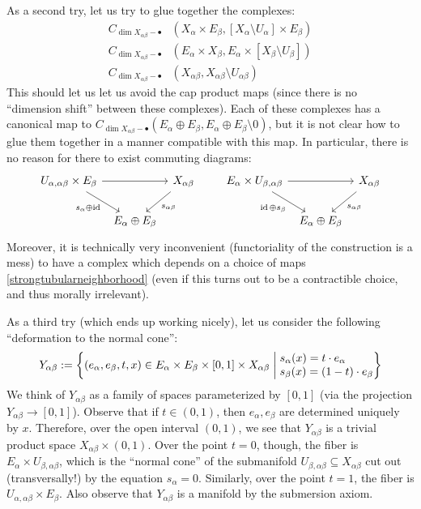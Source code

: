 \documentclass[12pt]{article}
\theoremstyle{definition}
\theoremstyle{remark}
\numberwithin{equation}{subsection}
\newcommand{\id}{\operatorname{id}}
\begin{document}
As a second try, let us try to glue together the complexes:
\begin{align}
C_{\dim X_{\alpha\beta}-\bullet}&(X_\alpha\times E_\beta,[X_\alpha\setminus U_\alpha]\times E_\beta)\\
C_{\dim X_{\alpha\beta}-\bullet}&(E_\alpha\times X_\beta,E_\alpha\times[X_\beta\setminus U_\beta])\\
C_{\dim X_{\alpha\beta}-\bullet}&(X_{\alpha\beta},X_{\alpha\beta}\setminus U_{\alpha\beta})
\end{align}
This should let us let us avoid the cap product maps (since there is no ``dimension shift'' between these complexes).  Each of these complexes has a canonical map to $C_{\dim X_{\alpha\beta}-\bullet}(E_\alpha\oplus E_\beta,E_\alpha\oplus E_\beta\setminus 0)$, but it is not clear how to glue them together in a manner compatible with this map.  In particular, there is no reason for there to exist commuting diagrams:
\begin{equation}\label{strongtubularneighborhood}
\begin{tikzcd}[column sep = tiny]
U_{\alpha,\alpha\beta}\times E_\beta\arrow{rr}\arrow{dr}[swap]{s_\alpha\oplus\id}&&X_{\alpha\beta}\arrow{dl}{s_{\alpha\beta}}\\
&E_\alpha\oplus E_\beta
\end{tikzcd}
\qquad
\begin{tikzcd}[column sep = tiny]
E_\alpha\times U_{\beta,\alpha\beta}\arrow{rr}\arrow{dr}[swap]{\id\oplus s_\beta}&&X_{\alpha\beta}\arrow{dl}{s_{\alpha\beta}}\\
&E_\alpha\oplus E_\beta
\end{tikzcd}
\end{equation}
Moreover, it is technically very inconvenient (functoriality of the construction is a mess) to have a complex which depends on a choice of maps \eqref{strongtubularneighborhood} (even if this turns out to be a contractible choice, and thus morally irrelevant).

As a third try (which ends up working nicely), let us consider the following ``deformation to the normal cone'':
\begin{equation}
Y_{\alpha\beta}:=\left\{(e_\alpha,e_\beta,t,x)\in E_\alpha\times E_\beta\times[0,1]\times X_{\alpha\beta}\;\middle|\;\begin{matrix}s_\alpha(x)=t\cdot e_\alpha\hfill\cr s_\beta(x)=(1-t)\cdot e_\beta\hfill\end{matrix}\right\}
\end{equation}
We think of $Y_{\alpha\beta}$ as a family of spaces parameterized by $[0,1]$ (via the projection $Y_{\alpha\beta}\to[0,1]$).  Observe that if $t\in(0,1)$, then $e_\alpha,e_\beta$ are determined uniquely by $x$.  Therefore, over the open interval $(0,1)$, we see that $Y_{\alpha\beta}$ is a trivial product space $X_{\alpha\beta}\times(0,1)$.  Over the point $t=0$, though, the fiber is $E_\alpha\times U_{\beta,\alpha\beta}$, which is the ``normal cone'' of the submanifold $U_{\beta,\alpha\beta}\subseteq X_{\alpha\beta}$ cut out (transversally!) by the equation $s_\alpha=0$.  Similarly, over the point $t=1$, the fiber is $U_{\alpha,\alpha\beta}\times E_\beta$.  Also observe that $Y_{\alpha\beta}$ is a manifold by the submersion axiom.
\end{document}
